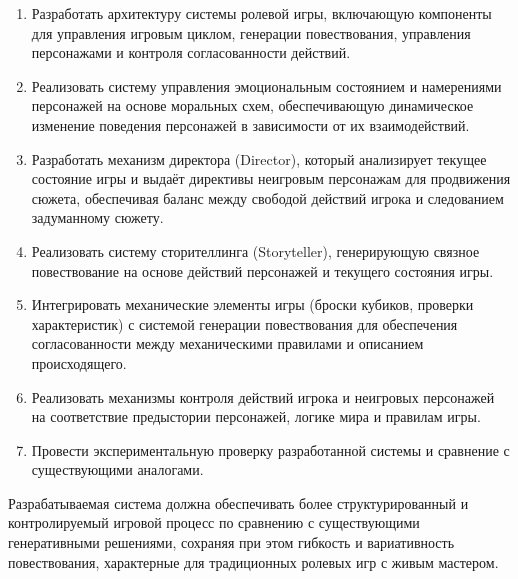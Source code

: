 \begin{enumerate}
	\item Разработать архитектуру системы ролевой игры, включающую компоненты для управления игровым циклом, генерации повествования, управления персонажами и контроля согласованности действий.
	
	\item Реализовать систему управления эмоциональным состоянием и намерениями персонажей на основе моральных схем, обеспечивающую динамическое изменение поведения персонажей в зависимости от их взаимодействий.
	
	\item Разработать механизм директора (Director), который анализирует текущее состояние игры и выдаёт директивы неигровым персонажам для продвижения сюжета, обеспечивая баланс между свободой действий игрока и следованием задуманному сюжету.
	
	\item Реализовать систему сторителлинга (Storyteller), генерирующую связное повествование на основе действий персонажей и текущего состояния игры.
	
	\item Интегрировать механические элементы игры (броски кубиков, проверки характеристик) с системой генерации повествования для обеспечения согласованности между механическими правилами и описанием происходящего.
	
	\item Реализовать механизмы контроля действий игрока и неигровых персонажей на соответствие предыстории персонажей, логике мира и правилам игры.
	
	\item Провести экспериментальную проверку разработанной системы и сравнение с существующими аналогами.
\end{enumerate}

Разрабатываемая система должна обеспечивать более структурированный и контролируемый игровой процесс по сравнению с существующими генеративными решениями, сохраняя при этом гибкость и вариативность повествования, характерные для традиционных ролевых игр с живым мастером. 

